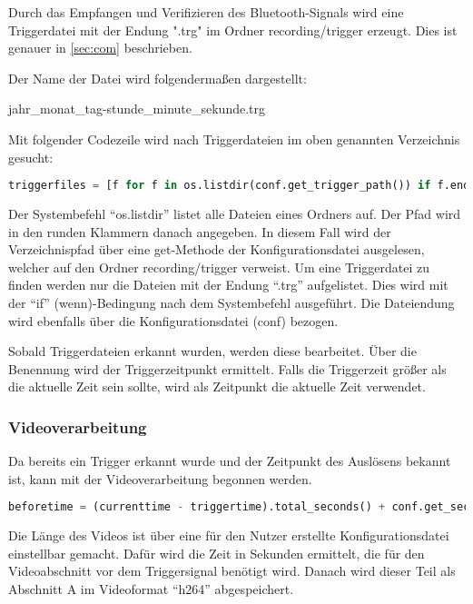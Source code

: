 Durch das Empfangen und Verifizieren des Bluetooth-Signals wird eine Triggerdatei mit der Endung ".trg" im Ordner recording/trigger erzeugt. Dies ist genauer in \ref{sec:com} beschrieben.

Der Name der Datei wird folgendermaßen dargestellt:
\begin{center}
	jahr\_monat\_tag-stunde\_minute\_sekunde.trg
\end{center}

Mit folgender Codezeile wird nach Triggerdateien im oben genannten Verzeichnis gesucht:

\begin{lstlisting}[language=Python]
triggerfiles = [f for f in os.listdir(conf.get_trigger_path()) if f.endswith(conf.get_trigger_fileextension())]
\end{lstlisting}

Der Systembefehl "`os.listdir"' listet alle Dateien eines Ordners auf. Der Pfad wird in den runden Klammern danach angegeben. In diesem Fall wird der Verzeichnispfad über eine get-Methode der Konfigurationsdatei ausgelesen, welcher auf den Ordner recording/trigger verweist. Um eine Triggerdatei zu finden werden nur die Dateien mit der Endung "`.trg"' aufgelistet. Dies wird mit der "`if"' (wenn)-Bedingung nach dem Systembefehl ausgeführt. Die Dateiendung wird ebenfalls über die Konfigurationsdatei (conf) bezogen.

Sobald Triggerdateien erkannt wurden, werden diese bearbeitet. Über die Benennung wird der Triggerzeitpunkt ermittelt. Falls die Triggerzeit größer als die aktuelle Zeit sein sollte, wird als Zeitpunkt die aktuelle Zeit verwendet.

\subsubsection{Videoverarbeitung}

Da bereits ein Trigger erkannt wurde und der Zeitpunkt des Auslösens bekannt ist, kann mit der Videoverarbeitung begonnen werden.

\begin{lstlisting}[language=Python]
beforetime = (currenttime - triggertime).total_seconds() + conf.get_secs_before()
\end{lstlisting}

Die Länge des Videos ist über eine für den Nutzer erstellte Konfigurationsdatei einstellbar gemacht. Dafür wird die Zeit in Sekunden ermittelt, die für den Videoabschnitt vor dem Triggersignal benötigt wird. Danach wird dieser Teil als Abschnitt A im Videoformat "`h264"' abgespeichert.

